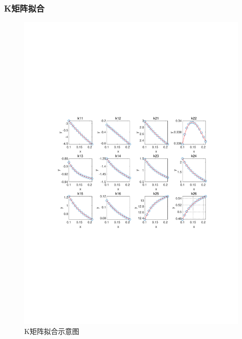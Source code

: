 \documentclass{beamer}
\begin{document}
	\begin{frame}
		\frametitle{K矩阵拟合}
		\begin{figure}          
			\centering
			\vspace{-150pt}             
			\includegraphics[width=\linewidth]{img/chapter3/data.pdf}  
			\captionsetup{font=scriptsize} 
			\vspace{-165pt} 
			\caption{K矩阵拟合示意图} 
			
		\end{figure}  
	\end{frame}
\end{document}
